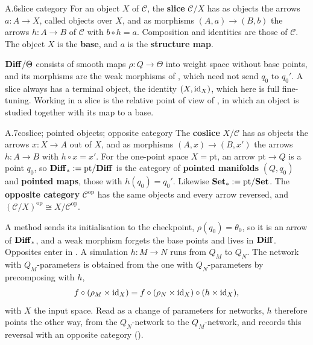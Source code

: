 
\begin{bgentry}{A.6}{slice category}
For an object $X$ of $\mathcal C$, the \textbf{slice} $\mathcal C/X$ has as objects the arrows $a:A\to X$, called
objects over $X$, and as morphisms $(A,a)\to(B,b)$ the arrows $h:A\to B$ of $\mathcal C$ with $b\circ h=a$. Composition
and identities are those of $\mathcal C$. The object $X$ is the \textbf{base}, and $a$ is the \textbf{structure map}.
\end{bgentry}

$\mathbf{Diff}/\Theta$ consists of smooth maps $\rho:Q\to\Theta$ into weight space without base points, and its morphisms are
the weak morphisms of , which need not send $q_0$ to $q_0'$. A slice always has a terminal
object, the identity $(X,\mathrm{id}_X)$, which here is full fine-tuning. Working in a slice is the relative point of view of
, in which an object is studied together with its map to a base.


\begin{bgentry}{A.7}{coslice; pointed objects; opposite category}
The \textbf{coslice} $X/\mathcal C$ has as objects the arrows $x:X\to A$ out of $X$, and as morphisms $(A,x)\to(B,x')$
the arrows $h:A\to B$ with $h\circ x=x'$. For the one-point space $X=\mathrm{pt}$, an arrow $\mathrm{pt}\to Q$ is a point
$q_0$, so $\mathbf{Diff}_*:=\mathrm{pt}/\mathbf{Diff}$ is the category of \textbf{pointed manifolds} $(Q,q_0)$ and \textbf{pointed
maps}, those with $h(q_0)=q_0'$. Likewise $\mathbf{Set}_*:=\mathrm{pt}/\mathbf{Set}$. The \textbf{opposite category}
$\mathcal C^{\mathrm{op}}$ has the same objects and every arrow reversed, and
$(\mathcal C/X)^{\mathrm{op}}\cong X/\mathcal C^{\mathrm{op}}$.
\end{bgentry}

A method sends its initialisation to the checkpoint, $\rho(q_0)=\theta_0$, so it is an arrow of $\mathbf{Diff}_*$, and a weak
morphism forgets the base points and lives in $\mathbf{Diff}$. Opposites enter in . A simulation
$h:M\to N$ runs from $Q_M$ to $Q_N$. The network with $Q_M$-parameters is obtained from the one with $Q_N$-parameters by
precomposing with $h$,
\begin{equation*}
  f\circ(\rho_M\times\mathrm{id}_X)=f\circ(\rho_N\times\mathrm{id}_X)\circ(h\times\mathrm{id}_X),
\end{equation*}
with $X$ the input space. Read as a change of parameters for networks, $h$ therefore points the other way, from the
$Q_N$-network to the $Q_M$-network, and  records this reversal with an opposite category
().

